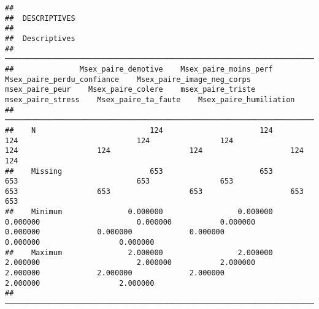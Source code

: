 \documentclass[
]{article}
\begin{document}
\begin{verbatim}
## 
##  DESCRIPTIVES
## 
##  Descriptives                                                                                                                                                                                                                                               
##  ────────────────────────────────────────────────────────────────────────────────────────────────────────────────────────────────────────────────────────────────────────────────────────────────────────────────────────────────────────────────────────── 
##               Msex_paire_demotive    Msex_paire_moins_perf    Msex_paire_perdu_confiance    Msex_paire_image_neg_corps    msex_paire_peur    Msex_paire_colere    msex_paire_triste    msex_paire_stress    Msex_paire_ta_faute    Msex_paire_humiliation   
##  ────────────────────────────────────────────────────────────────────────────────────────────────────────────────────────────────────────────────────────────────────────────────────────────────────────────────────────────────────────────────────────── 
##    N                          124                      124                           124                           124                124                  124                  124                  124                    124                       124   
##    Missing                    653                      653                           653                           653                653                  653                  653                  653                    653                       653   
##    Minimum               0.000000                 0.000000                      0.000000                      0.000000           0.000000             0.000000             0.000000             0.000000               0.000000                  0.000000   
##    Maximum               2.000000                 2.000000                      2.000000                      2.000000           2.000000             2.000000             2.000000             2.000000               2.000000                  2.000000   
##  ──────────────────────────────────────────────────────────────────────────────────────────────────────────────────────────────────────────────────────────────────────────────────────────────────────────────────────────────────────────────────────────
\end{verbatim}
\end{document}
